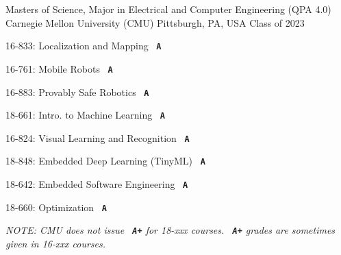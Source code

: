 
\newcommand{\grade}[1]{\ \textcolor{awesome-orange}{\textbf{\texttt{{#1}}}}}



\begin{cventries}


\cventry
{Masters of Science, Major in Electrical and Computer Engineering (QPA 4.0)} %
{Carnegie Mellon University (CMU)} %
{Pittsburgh, PA, USA} %
{Class of 2023} %
{ %
    \vspace{-0.5em}
    \begin{cvitems}
        \begin{multicols}{2}[]
            \item 16-833: Localization and Mapping \grade{A}
            \item 16-761: Mobile Robots \grade{A}
            \item 16-883: Provably Safe Robotics \grade{A}
            \item 18-661: Intro. to Machine Learning \grade{A}
            \item 16-824: Visual Learning and Recognition \grade{A}
            \item 18-848: Embedded Deep Learning (TinyML) \grade{A}
            \item 18-642: Embedded Software Engineering \grade{A}
            \item 18-660: Optimization \grade{A}
        \end{multicols}
    \end{cvitems}\smallskip
    \textit{\scriptsize NOTE: CMU does not issue \grade{A+} for 18-xxx courses. \grade{A+} grades are sometimes given in 16-xxx courses.}
}


\end{cventries}
